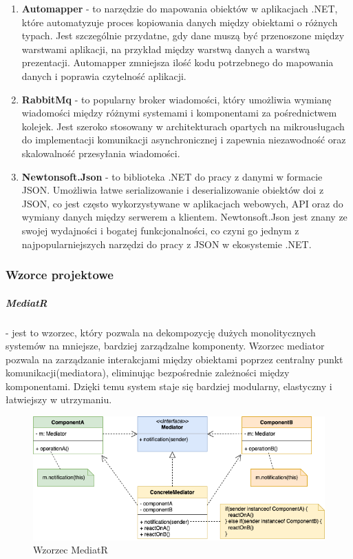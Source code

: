 \begin{enumerate}
\item {\bf Automapper} -  to narzędzie do mapowania obiektów w aplikacjach .NET, które automatyzuje proces kopiowania danych między obiektami o różnych typach. Jest szczególnie przydatne, gdy dane muszą być przenoszone między warstwami aplikacji, na przykład między warstwą danych \linebreak a warstwą prezentacji. Automapper zmniejsza ilość kodu potrzebnego do mapowania danych i poprawia czytelność aplikacji.

\item {\bf RabbitMq} - to popularny broker wiadomości, który umożliwia wymianę wiadomości między różnymi systemami i komponentami za pośrednictwem kolejek. Jest szeroko stosowany w architekturach opartych na mikrousługach do implementacji komunikacji asynchronicznej i zapewnia niezawodność oraz skalowalność przesyłania wiadomości.

\item {\bf Newtonsoft.Json} - to biblioteka .NET do pracy z danymi w formacie JSON. Umożliwia łatwe serializowanie i deserializowanie obiektów do\linebreak i z JSON, co jest często wykorzystywane w aplikacjach webowych, API oraz do wymiany danych między serwerem a klientem. Newtonsoft.Json jest znany ze swojej wydajności i bogatej funkcjonalności, co czyni go jednym z najpopularniejszych narzędzi do pracy z JSON w ekosystemie .NET.

\end{enumerate}

\clearpage

\subsubsection{Wzorce projektowe}

\subparagraph{MediatR} - jest to wzorzec, który pozwala na dekompozycję dużych monolitycznych systemów na mniejsze, bardziej zarządzalne komponenty. Wzorzec mediator pozwala na zarządzanie interakcjami między obiektami poprzez centralny punkt komunikacji(mediatora), eliminując bezpośrednie zależności między komponentami. Dzięki temu system staje się bardziej modularny, elastyczny i łatwiejszy w utrzymaniu.

\begin{figure}[H]
    \centering
    \includegraphics[width=1\linewidth]{Obrazy/mediatR.png}
    \caption{Wzorzec MediatR}
    \label{fig:enter-label}
\end{figure}

